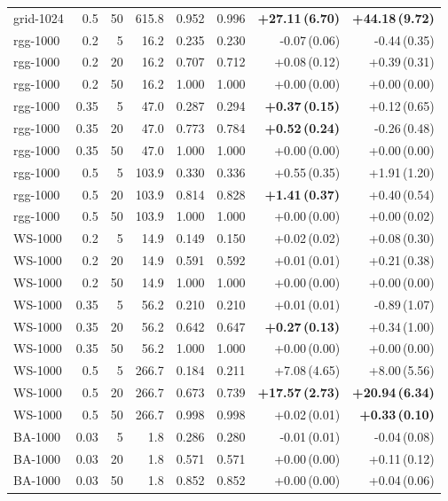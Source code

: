 \documentclass[ijoc,sglanonrev]{informs4}
\begin{document}
\begin{table}[h]
{\begin{tabular}{lrrrrrrr}
grid-1024 & 0.5 & 50 & 615.8 & 0.952 & 0.996 & \textbf{+27.11\,(6.70)} & \textbf{+44.18\,(9.72)} \\
rgg-1000 & 0.2 & 5 & 16.2 & 0.235 & 0.230 & -0.07\,(0.06) & -0.44\,(0.35) \\
rgg-1000 & 0.2 & 20 & 16.2 & 0.707 & 0.712 & +0.08\,(0.12) & +0.39\,(0.31) \\
rgg-1000 & 0.2 & 50 & 16.2 & 1.000 & 1.000 & +0.00\,(0.00) & +0.00\,(0.00) \\
rgg-1000 & 0.35 & 5 & 47.0 & 0.287 & 0.294 & \textbf{+0.37\,(0.15)} & +0.12\,(0.65) \\
rgg-1000 & 0.35 & 20 & 47.0 & 0.773 & 0.784 & \textbf{+0.52\,(0.24)} & -0.26\,(0.48) \\
rgg-1000 & 0.35 & 50 & 47.0 & 1.000 & 1.000 & +0.00\,(0.00) & +0.00\,(0.00) \\
rgg-1000 & 0.5 & 5 & 103.9 & 0.330 & 0.336 & +0.55\,(0.35) & +1.91\,(1.20) \\
rgg-1000 & 0.5 & 20 & 103.9 & 0.814 & 0.828 & \textbf{+1.41\,(0.37)} & +0.40\,(0.54) \\
rgg-1000 & 0.5 & 50 & 103.9 & 1.000 & 1.000 & +0.00\,(0.00) & +0.00\,(0.02) \\
WS-1000 & 0.2 & 5 & 14.9 & 0.149 & 0.150 & +0.02\,(0.02) & +0.08\,(0.30) \\
WS-1000 & 0.2 & 20 & 14.9 & 0.591 & 0.592 & +0.01\,(0.01) & +0.21\,(0.38) \\
WS-1000 & 0.2 & 50 & 14.9 & 1.000 & 1.000 & +0.00\,(0.00) & +0.00\,(0.00) \\
WS-1000 & 0.35 & 5 & 56.2 & 0.210 & 0.210 & +0.01\,(0.01) & -0.89\,(1.07) \\
WS-1000 & 0.35 & 20 & 56.2 & 0.642 & 0.647 & \textbf{+0.27\,(0.13)} & +0.34\,(1.00) \\
WS-1000 & 0.35 & 50 & 56.2 & 1.000 & 1.000 & +0.00\,(0.00) & +0.00\,(0.00) \\
WS-1000 & 0.5 & 5 & 266.7 & 0.184 & 0.211 & +7.08\,(4.65) & +8.00\,(5.56) \\
WS-1000 & 0.5 & 20 & 266.7 & 0.673 & 0.739 & \textbf{+17.57\,(2.73)} & \textbf{+20.94\,(6.34)} \\
WS-1000 & 0.5 & 50 & 266.7 & 0.998 & 0.998 & +0.02\,(0.01) & \textbf{+0.33\,(0.10)} \\
BA-1000 & 0.03 & 5 & 1.8 & 0.286 & 0.280 & -0.01\,(0.01) & -0.04\,(0.08) \\
BA-1000 & 0.03 & 20 & 1.8 & 0.571 & 0.571 & +0.00\,(0.00) & +0.11\,(0.12) \\
BA-1000 & 0.03 & 50 & 1.8 & 0.852 & 0.852 & +0.00\,(0.00) & +0.04\,(0.06) \\

\end{tabular}}
\end{table}
\end{document}
